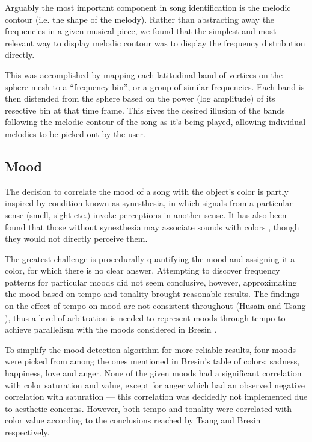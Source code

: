 \documentclass{article}
\begin{document}
Arguably the most important component in song identification is the melodic contour (i.e. the shape of the melody). Rather than abstracting away the frequencies in a given musical piece, we found that the simplest and most relevant way to display melodic contour was to display the frequency distribution directly.

This was accomplished by mapping each latitudinal band of vertices on the sphere mesh to a ``frequency bin'', or a group of similar frequencies. Each band is then distended from the sphere based on the power (log amplitude) of its resective bin at that time frame. This gives the desired illusion of the bands following the melodic contour of the song as it's being played, allowing individual melodies to be picked out by the user.

\subsection{Mood}

The decision to correlate the mood of a song with the object's color is partly inspired by condition known as synesthesia, in which signals from a particular sense (smell, sight etc.) invoke perceptions in another sense. It has also been found that those without synesthesia may associate sounds with colors \cite{tsang}, though they would not directly perceive them.

The greatest challenge is procedurally quantifying the mood and assigning it a color, for which there is no clear answer. Attempting to discover frequency patterns for particular moods did not seem conclusive, however, approximating the mood based on tempo and tonality brought reasonable results. The findings on the effect of tempo on mood are not consistent throughout (Husain \cite{husain} and Tsang \cite{tsang}), thus a level of arbitration is needed to represent moods through tempo to achieve parallelism with the moods considered in Bresin \cite{bresin}.

To simplify the mood detection algorithm for more reliable results, four moods were picked from among the ones mentioned in Bresin's table of colors: sadness, happiness, love and anger. None of the given moods had a significant correlation with color saturation and value, except for anger which had an observed negative correlation with saturation --- this correlation was decidedly not implemented due to aesthetic concerns. However, both tempo and tonality were correlated with color value according to the conclusions reached by Tsang and Bresin respectively.
\end{document}
